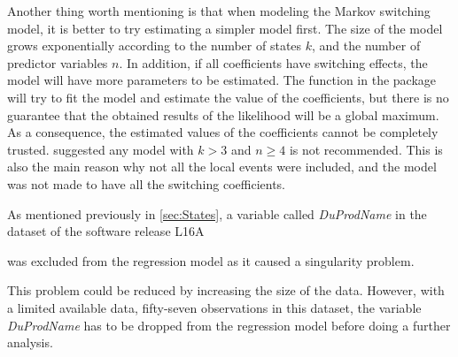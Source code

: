 Another thing worth mentioning is that when modeling the Markov switching
model, it is better to try estimating a simpler model first. The size
of the model grows exponentially according to the number of states
$k$, and the number of predictor variables $n$. In addition, if
all coefficients have switching effects, the model will have more
parameters to be estimated. The function in the package will try to
fit the model and estimate the value of the coefficients, but there
is no guarantee that the obtained results of the likelihood will be
a global maximum. As a consequence, the estimated values of the coefficients
cannot be completely trusted. \citet{perlin2015ms_regress} suggested
any model with $k>3$ and $n\geq4$ is not recommended. This is also
the main reason why not all the local events were included, and the
model was not made to have all the switching coefficients. 

As mentioned previously in \ref{sec:States}, a variable called \emph{DuProdName}
in the dataset of the software release L16A%
\begin{comment}
, which is an exact linear combination of the other variables,
\end{comment}
{} was excluded from the regression model as it caused a singularity
problem. %
\begin{comment}
The singularity often happens when the size of data is small. 
\end{comment}
This problem could be reduced by increasing the size of the data.
However, with a limited available data, fifty-seven observations in
this dataset, the variable \emph{DuProdName} has to be dropped from
the regression model before doing a further analysis. %
\begin{comment}
Fifty-seven observations in this dataset were used to train the Markov
switching model. The dataset (or the number of test cases in the software
release) is rather small, which increases a probability of singularity
occurrence. Therefore, unless there is more data, it is better to
drop the variable from the regression model before doing a further
analysis.
\end{comment}

